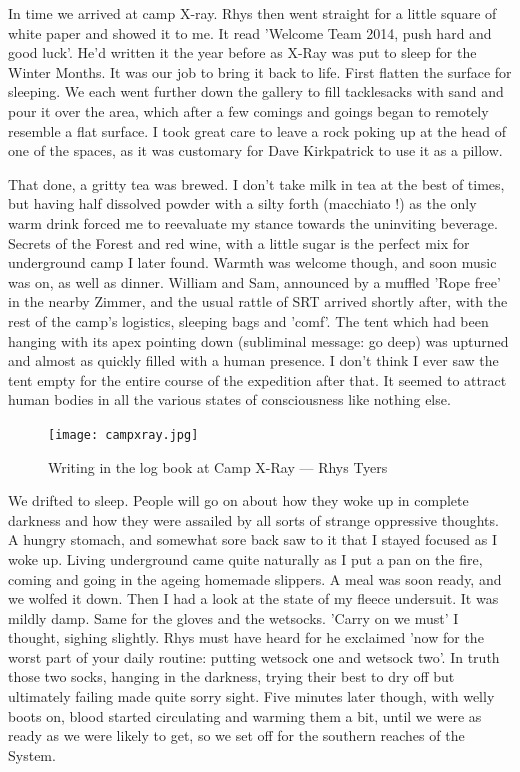 \documentclass[onecolumn]{book}
\begin{document}
In time we arrived at camp X-ray. Rhys then went straight for a little square of white paper and showed it to me. It read 'Welcome Team 2014, push hard and good luck'. He'd written it the year before as X-Ray was put to sleep for the Winter Months. It was our job to bring it back to life. First flatten the surface for sleeping. We each went  further down the gallery to fill tacklesacks with sand and pour it over the area, which after a few comings and goings began to remotely resemble a flat surface. I took great care to leave a rock poking up at the head of one of the spaces, as it was customary for Dave Kirkpatrick to use it as a pillow. 

That done, a gritty tea was brewed. I don't take milk in tea at the best of times, but having half dissolved powder with a silty forth (macchiato !) as the only warm drink forced me to reevaluate my stance towards the uninviting beverage. Secrets of the Forest and red wine, with a little sugar is the perfect mix for underground camp I later found. Warmth was welcome though, and soon music was on, as well as dinner. William and Sam, announced by a muffled 'Rope free' in the nearby Zimmer, and the usual rattle of SRT arrived shortly after, with the rest of the camp's logistics, sleeping bags and 'comf'. The tent which had been hanging with its apex pointing down (subliminal message: go deep) was upturned and almost as quickly filled with a human presence. I don't think I ever saw the tent empty for the entire course of the expedition after that. It seemed to attract human bodies in all the various states of consciousness like nothing else.

\begin{figure}[h]
\centering
\texttt{[image: campxray.jpg]}
\caption{Writing in the log book at Camp X-Ray --- Rhys Tyers}
\label{Camp X-Ray}
\end{figure}

We drifted to sleep. People will go on about how they woke up in complete darkness and how they were assailed by all sorts of strange oppressive thoughts. A hungry stomach, and somewhat sore back saw to it that I stayed focused as I woke up. Living underground came quite naturally as I put a pan on the fire, coming and going in the ageing homemade slippers. A meal was soon ready, and we wolfed it down. Then I had a look at the state of my fleece undersuit. It was mildly damp. Same for the gloves and the wetsocks. 'Carry on we must' I thought, sighing slightly. Rhys must have heard for he exclaimed 'now for the worst part of your daily routine: putting wetsock one and wetsock two'. In truth those two socks, hanging in the darkness, trying their best to dry off but ultimately failing made quite sorry sight. Five minutes later though, with welly boots on, blood started circulating and warming them a bit, until we were as ready as we were likely to get, so we set off for the southern reaches of the System.
\end{document}
